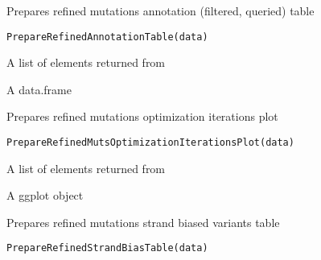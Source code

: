 \documentclass[letterpaper]{book}
\begin{document}
%
\begin{Description}\relax
Prepares refined mutations annotation (filtered, queried) table
\end{Description}
%
\begin{Usage}
\begin{verbatim}
PrepareRefinedAnnotationTable(data)
\end{verbatim}
\end{Usage}
%
\begin{Arguments}
\begin{ldescription}
\item[\code{data}] A list of elements returned from 
\end{ldescription}
\end{Arguments}
%
\begin{Value}
A data.frame
\end{Value}
%
\begin{Description}\relax
Prepares refined mutations optimization iterations plot
\end{Description}
%
\begin{Usage}
\begin{verbatim}
PrepareRefinedMutsOptimizationIterationsPlot(data)
\end{verbatim}
\end{Usage}
%
\begin{Arguments}
\begin{ldescription}
\item[\code{data}] A list of elements returned from 
\end{ldescription}
\end{Arguments}
%
\begin{Value}
A ggplot object
\end{Value}
%
\begin{Description}\relax
Prepares refined mutations strand biased variants table
\end{Description}
%
\begin{Usage}
\begin{verbatim}
PrepareRefinedStrandBiasTable(data)
\end{verbatim}
\end{Usage}
\end{document}
